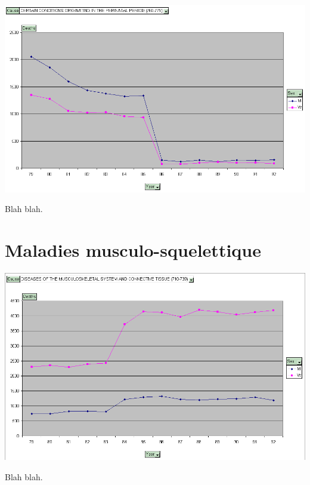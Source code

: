     \includegraphics[scale=0.5]{images/perinatal.png}

    Blah blah.

\section{Maladies musculo-squelettique}

    \includegraphics[scale=0.5]{images/muscoskeletal.png}

    Blah blah.